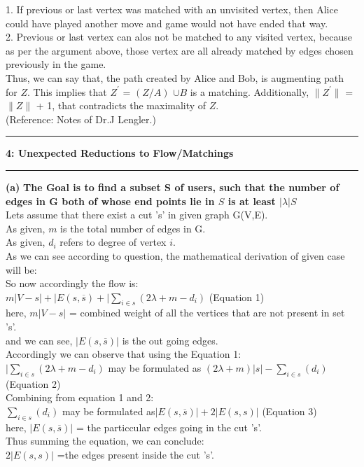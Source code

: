 \documentclass[11pt]{article}
\newcommand\question[2]{\vspace{.25in}\hrule\textbf{#1: #2}\vspace{.5em}\hrule\vspace{.10in}}
\renewcommand\part[1]{\vspace{.10in}\textbf{(#1)}}
\begin{document}
1. If previous or last vertex was matched with an unvisited vertex, then Alice could have played another move and game would not have ended that way.\\
2. Previous or last vertex can alos not be matched to any visited vertex, because as per the argument above, those vertex are all already matched by edges chosen previously in the game.\\
Thus, we can say that, the path created by Alice and Bob, is augmenting path for $Z$. This implies that $Z^{'}$ = $(Z/ A)$ $\cup B$ is a matching. Additionally, $\| Z^{'}\|$ = $\|Z\|$ + 1, that contradicts the maximality of $Z$.\\
(Reference: Notes of Dr.J Lengler.)


\question{4}{Unexpected Reductions to Flow/Matchings}

\part{a} {\bf The Goal is to find a subset S of users, such that the number of edges in G both of whose end points lie in $S$ is at least $|\lambda| S$}\\[10pt]
Lets assume that there exist a cut 's' in given graph G(V,E).\\
As given, $m$ is the total number of edges in G.\\
As given, $d_i$ refers to degree of vertex $i$.\\
As we can see according to question, the mathematical derivation of given case will be:\\
So now accordingly the flow is:\\[10pt] 
$m|V-s|+|E(s,\overline{s})+|\sum_{i\in s}^{} (2\lambda +m -d_i)$ (Equation 1)\\
here, $m|V-s|$ = combined weight of all the vertices that are not present in set 's'.
\\and we can see, $|E(s,\overline{s})|$ is the out going edges.\\[10pt]
Accordingly we can observe that using the Equation 1:\\
$|\sum_{i\in s}^{} (2\lambda +m -d_i)$ may be formulated as $(2\lambda +m)|s|-\sum_{i\in s}^{} (d_i)$ (Equation 2)\\[10pt]
Combining from equation 1 and 2:\\
$\sum_{i\in s}^{} (d_i)$ may be formulated as$|E(s,\overline{s})| + 2|E(s,s)|$ (Equation 3)\\
here, $|E(s,\overline{s})|$ = the particcular edges going in the cut 's'.\\[10pt]
Thus summing the equation, we can conclude:\\
$2|E(s,s)|$ =the edges present inside the cut 's'.\\[15pt]
\end{document}
